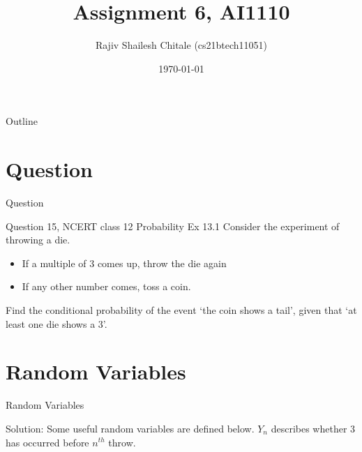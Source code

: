 \documentclass{beamer}
\begin{document}
\let\StandardTheFigure\thefigure
\let\vec\mathbf

\def\putbox#1#2#3{\makebox[0in][l]{\makebox[#1][l]{}\raisebox{\baselineskip}[0in][0in]{\raisebox{#2}[0in][0in]{#3}}}}
     \def\rightbox#1{\makebox[0in][r]{#1}}
     \def\centbox#1{\makebox[0in]{#1}}
     \def\topbox#1{\raisebox{-\baselineskip}[0in][0in]{#1}}
     \def\midbox#1{\raisebox{-0.5\baselineskip}[0in][0in]{#1}}
\vspace{3cm}


\title{Assignment 6, AI1110} 
\author{Rajiv Shailesh Chitale (cs21btech11051)}
\date{\today}
\logo{\large \LaTeX{}}
\begin{frame}
    \titlepage 
\end{frame}

\logo{}

\begin{frame}{Outline}
    \tableofcontents
\end{frame}
\section{Question}

\begin{frame}{Question}
     \begin{block}{ Question 15, NCERT class 12 Probability Ex 13.1}
    Consider the experiment of throwing a die.
    \begin{itemize}
        \item If a multiple of 3 comes up, throw the die again
        \item If any other number comes, toss a coin.
    \end{itemize}
     Find the conditional probability of the event \lq the coin shows a tail\rq, given that \lq at least one die shows a 3\rq.
     \end{block} 
\end{frame}

\section{Random Variables}
\begin{frame}{Random Variables}
    \begin{block}{Solution:}
    Some useful random variables are defined below. $Y_n$ describes whether 3 has occurred before $n^{th}$ throw.
    \begin{table}[ht!]
        \centering
    	
        \caption{Random variables}
        \label{table:RandomVariables}	
    \end{table}
    \end{block}
\end{frame}
\end{document}
